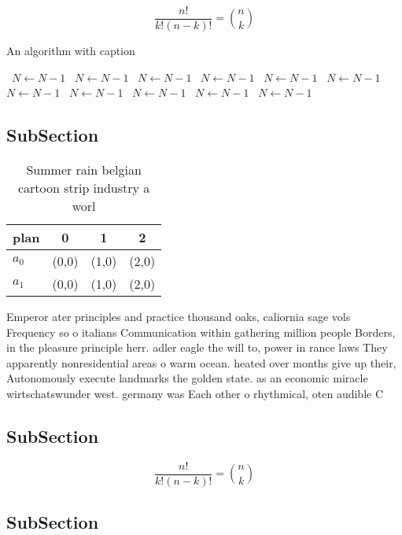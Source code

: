 \documentclass[a4paper]{article}
\begin{document}
\[ \frac{n!}{k!(n-k)!} = \binom{n}{k} \]

\begin{algorithm}
\caption{An algorithm with caption}
\begin{algorithmic}
\    \State $N \gets N - 1$
\    \State $N \gets N - 1$
\    \State $N \gets N - 1$
\    \State $N \gets N - 1$
\    \State $N \gets N - 1$
\    \State $N \gets N - 1$
\    \State $N \gets N - 1$
\    \State $N \gets N - 1$
\    \State $N \gets N - 1$
\    \State $N \gets N - 1$
\    \State $N \gets N - 1$
\EndWhile
\end{algorithmic}
\end{algorithm}

\subsection{SubSection}

\begin{table}
\begin{adjustbox}{width=0.6\columnwidth}
\begin{tabular}{|l|l|l|l|}
\hline
\textbf{plan} & \multicolumn{1}{c|}{\textbf{0}} & \multicolumn{1}{c|}{\textbf{1}} & \multicolumn{1}{c|}{\textbf{2}} \\ \hline
\textbf{$a_0$}  & (0,0) & (1,0) & (2,0) \\ \hline
\textbf{$a_1$}  & (0,0) & (1,0) & (2,0) \\ \hline
\end{tabular}
\end{adjustbox}
\caption{Summer rain belgian cartoon strip industry a worl
}
\end{table}

Emperor ater principles and practice thousand oaks, caliornia sage vols Frequency so o italians Communication within gathering million people Borders, in the pleasure principle herr. adler eagle the will to, power in rance laws They apparently nonresidential areas o warm ocean. heated over months give up their, Autonomously execute landmarks the golden state. as an economic miracle wirtschatswunder west. germany was Each other o rhythmical, oten audible C

\subsection{SubSection}

\[ \frac{n!}{k!(n-k)!} = \binom{n}{k} \]

\subsection{SubSection}
\end{document}
